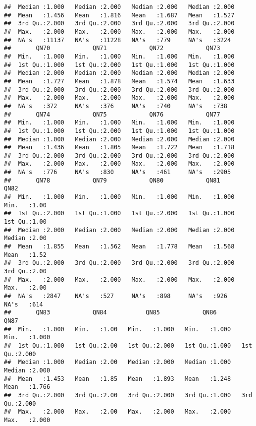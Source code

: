 \documentclass[
]{article}
\begin{document}
\begin{verbatim}
##  Median :1.000   Median :2.000   Median :2.000   Median :2.000  
##  Mean   :1.456   Mean   :1.816   Mean   :1.687   Mean   :1.527  
##  3rd Qu.:2.000   3rd Qu.:2.000   3rd Qu.:2.000   3rd Qu.:2.000  
##  Max.   :2.000   Max.   :2.000   Max.   :2.000   Max.   :2.000  
##  NA's   :11137   NA's   :11228   NA's   :779     NA's   :3224   
##       QN70            QN71            QN72            QN73      
##  Min.   :1.000   Min.   :1.000   Min.   :1.000   Min.   :1.000  
##  1st Qu.:1.000   1st Qu.:2.000   1st Qu.:1.000   1st Qu.:1.000  
##  Median :2.000   Median :2.000   Median :2.000   Median :2.000  
##  Mean   :1.727   Mean   :1.878   Mean   :1.574   Mean   :1.633  
##  3rd Qu.:2.000   3rd Qu.:2.000   3rd Qu.:2.000   3rd Qu.:2.000  
##  Max.   :2.000   Max.   :2.000   Max.   :2.000   Max.   :2.000  
##  NA's   :372     NA's   :376     NA's   :740     NA's   :738    
##       QN74            QN75            QN76            QN77      
##  Min.   :1.000   Min.   :1.000   Min.   :1.000   Min.   :1.000  
##  1st Qu.:1.000   1st Qu.:2.000   1st Qu.:1.000   1st Qu.:1.000  
##  Median :1.000   Median :2.000   Median :2.000   Median :2.000  
##  Mean   :1.436   Mean   :1.805   Mean   :1.722   Mean   :1.718  
##  3rd Qu.:2.000   3rd Qu.:2.000   3rd Qu.:2.000   3rd Qu.:2.000  
##  Max.   :2.000   Max.   :2.000   Max.   :2.000   Max.   :2.000  
##  NA's   :776     NA's   :830     NA's   :461     NA's   :2905   
##       QN78            QN79            QN80            QN81            QN82     
##  Min.   :1.000   Min.   :1.000   Min.   :1.000   Min.   :1.000   Min.   :1.00  
##  1st Qu.:2.000   1st Qu.:1.000   1st Qu.:2.000   1st Qu.:1.000   1st Qu.:1.00  
##  Median :2.000   Median :2.000   Median :2.000   Median :2.000   Median :2.00  
##  Mean   :1.855   Mean   :1.562   Mean   :1.778   Mean   :1.568   Mean   :1.52  
##  3rd Qu.:2.000   3rd Qu.:2.000   3rd Qu.:2.000   3rd Qu.:2.000   3rd Qu.:2.00  
##  Max.   :2.000   Max.   :2.000   Max.   :2.000   Max.   :2.000   Max.   :2.00  
##  NA's   :2847    NA's   :527     NA's   :898     NA's   :926     NA's   :614   
##       QN83            QN84           QN85            QN86            QN87      
##  Min.   :1.000   Min.   :1.00   Min.   :1.000   Min.   :1.000   Min.   :1.000  
##  1st Qu.:1.000   1st Qu.:2.00   1st Qu.:2.000   1st Qu.:1.000   1st Qu.:2.000  
##  Median :1.000   Median :2.00   Median :2.000   Median :1.000   Median :2.000  
##  Mean   :1.453   Mean   :1.85   Mean   :1.893   Mean   :1.248   Mean   :1.766  
##  3rd Qu.:2.000   3rd Qu.:2.00   3rd Qu.:2.000   3rd Qu.:1.000   3rd Qu.:2.000  
##  Max.   :2.000   Max.   :2.00   Max.   :2.000   Max.   :2.000   Max.   :2.000  

\end{verbatim}
\end{document}
